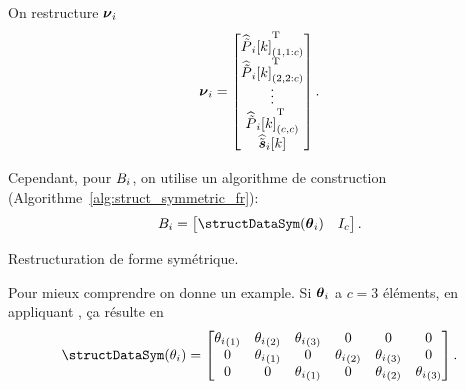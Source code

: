 \documentclass[../main.tex]{subfiles}
\begin{document}
On restructure ${\boldsymbol{\nu}_{i}}$
\begin{equation}
  \rlsparam=\left[
    \begin{matrix}
      \elem[1,1:c]{\Plintildeestimate}\T\\
      \elem[2,2:c]{\Plintildeestimate}\T\\
      \vdots\\
      \elem[c,c]{\Plintildeestimate}\T\\
      \siktildeestimate\\
    \end{matrix}
  \right].
\end{equation}

Cependant, pour ${B_i}$, on utilise un algorithme de construction (Algorithme~\ref{alg:struct_symmetric_fr}):
\begin{equation}
  \rlssysinput=\left[
    \begin{matrix}
      \text{\structDataSym}(\thetai) &  I_{c}
    \end{matrix}
  \right].
\end{equation}

\begin{algorithm2e}[h]
  \DontPrintSemicolon%
          \caption{Restructuration de forme symétrique.}\label{alg:struct_symmetric_fr}
        \end{algorithm2e}
Pour mieux comprendre on donne un example.
Si $\boldsymbol{\theta}_{i}$ a ${c=3}$ éléments, en appliquant \structDataSym, ça résulte en
\begin{equation}
  \text{\structDataSym}(\theta_i)=
  \left[
  \begin{matrix}
     \elem[1]{\theta_{i}}  &   \elem[2]{\theta_{i}}   &  \elem[3]{\theta_{i}} &    0  &   0  &   0 \\
     0  &   \elem[1]{\theta_{i}}   &  0 &    \elem[2]{\theta_{i}}  &   \elem[3]{\theta_{i}}  &   0 \\
     0  &   0   &  \elem[1]{\theta_{i}} &    0  &   \elem[2]{\theta_{i}}  &   \elem[3]{\theta_{i}}
  \end{matrix}
  \right].
\end{equation}
\end{document}
